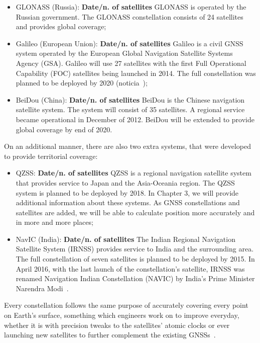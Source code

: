 \begin{itemize}
    \item GLONASS (Russia): \textbf{Date/n. of satellites} GLONASS is operated by the Russian government. The GLONASS constellation consists of 24 satellites and provides global coverage;
    \item Galileo (European Union): \textbf{Date/n. of satellites} Galileo is a civil GNSS system operated by the European Global Navigation Satellite Systems
    Agency (GSA). Galileo will use 27 satellites with the first Full Operational Capability (FOC) satellites being launched in 2014. The full constellation was planned to be deployed by 2020 (noticia~\cite{euspa_news_2022});
    \item BeiDou (China): \textbf{Date/n. of satellites} BeiDou is the Chinese navigation satellite system. The system will consist of 35 satellites. A regional service became operational in December of 2012. BeiDou will be extended to provide global coverage by end of 2020.
\end{itemize}
On an additional manner, there are also two extra systems, that were developed to provide territorial coverage:

\begin{itemize}
    \item QZSS: \textbf{Date/n. of satellites} QZSS is a regional navigation satellite system that provides service to Japan and the Asia-Oceania region. The QZSS system is planned to be deployed by 2018.
    In Chapter 3, we will provide additional information about these systems. As GNSS constellations and satellites are added, we will be able to calculate position more accurately and in more and more places;
    \item NavIC (India): \textbf{Date/n. of satellites} The Indian Regional Navigation Satellite System (IRNSS) provides service to India and the surrounding area. The full constellation of seven satellites is planned to be deployed by 2015.
    In April 2016, with the last launch of the constellation's satellite, IRNSS was renamed Navigation Indian Constellation (NAVIC) by India's Prime Minister Narendra Modi~\cite{navic_news_2016}.
\end{itemize}
Every constellation follows the same purpose of accurately covering every point on Earth's surface, something which engineers work on to improve everyday, whether it is with precision tweaks to the satellites' atomic clocks or ever launching new satellites to further complement the existing GNSSs~\cite{euspa_news_2022}.

